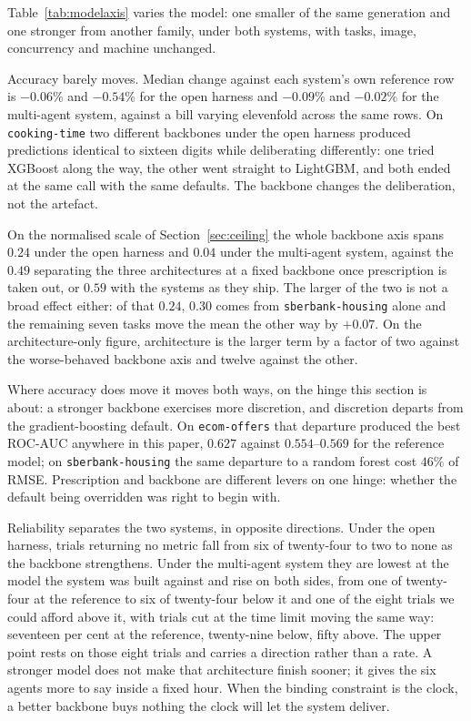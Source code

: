 Table~\ref{tab:modelaxis} varies the model: one smaller of the same generation
and one stronger from another family, under both systems, with tasks, image,
concurrency and machine unchanged.



Accuracy barely moves. Median change against each system's own reference row is
$-0.06\%$ and $-0.54\%$ for the open harness and $-0.09\%$ and $-0.02\%$ for the
multi-agent system, against a bill varying elevenfold across the same rows. On
\texttt{cooking-time} two different backbones under the open harness produced
predictions identical to sixteen digits while deliberating differently: one tried
XGBoost along the way, the other went straight to LightGBM, and both ended at the
same call with the same defaults. The backbone changes the deliberation, not the
artefact.

On the normalised scale of Section~\ref{sec:ceiling} the whole backbone axis
spans $0.24$ under the open harness and $0.04$ under the multi-agent system,
against the $0.49$ separating the three architectures at a fixed backbone once
prescription is taken out, or $0.59$ with the systems as they ship. The larger of
the two is not a broad effect either: of that $0.24$, $0.30$ comes from
\texttt{sberbank-housing} alone and the remaining seven tasks move the mean the
other way by $+0.07$. On the architecture-only figure, architecture is the larger
term by a factor of two against the worse-behaved backbone axis and twelve
against the other.

Where accuracy does move it moves both ways, on the hinge this section is about:
a stronger backbone exercises more discretion, and discretion departs from the
gradient-boosting default. On \texttt{ecom-offers} that departure produced the
best ROC-AUC anywhere in this paper, $0.627$ against $0.554$--$0.569$ for the
reference model; on \texttt{sberbank-housing} the same departure to a random
forest cost $46\%$ of RMSE. Prescription and backbone are different levers on one
hinge: whether the default being overridden was right to begin with.

Reliability separates the two systems, in opposite directions. Under the open
harness, trials returning no metric fall from six of twenty-four to two to none
as the backbone strengthens. Under the multi-agent system they are lowest at the
model the system was built against and rise on both sides, from one of
twenty-four at the reference to six of twenty-four below it and one of the eight
trials we could afford above it, with trials cut at the time limit moving the
same way: seventeen per cent at the reference, twenty-nine below, fifty above.
The upper point rests on those eight trials and carries a direction rather than
a rate. A
stronger model does not make that architecture finish sooner; it gives the six
agents more to say inside a fixed hour. When the binding constraint is the clock,
a better backbone buys nothing the clock will let the system deliver.

